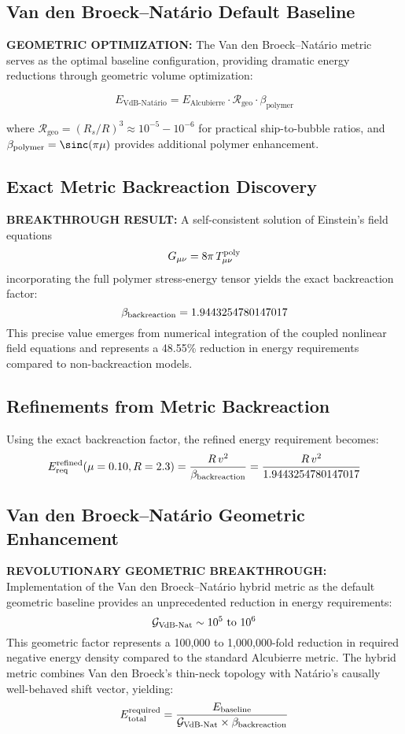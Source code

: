\documentclass[11pt]{article}
\begin{document}
\subsection*{Van den Broeck–Natário Default Baseline}
\textbf{GEOMETRIC OPTIMIZATION:} The Van den Broeck–Natário metric serves as the optimal baseline configuration, providing dramatic energy reductions through geometric volume optimization:

\begin{equation}
E_{\text{VdB-Natário}} = E_{\text{Alcubierre}} \cdot \mathcal{R}_{\text{geo}} \cdot \beta_{\text{polymer}}
\end{equation}

where $\mathcal{R}_{\text{geo}} = (R_s/R)^3 \approx 10^{-5} - 10^{-6}$ for practical ship-to-bubble ratios, and $\beta_{\text{polymer}} = \sinc(\pi\mu)$ provides additional polymer enhancement.

\subsection*{Exact Metric Backreaction Discovery}
\textbf{BREAKTHROUGH RESULT:}  
A self-consistent solution of Einstein's field equations
\[
  G_{\mu\nu} = 8\pi\,T_{\mu\nu}^{\rm poly}
\]
incorporating the full polymer stress-energy tensor yields the exact backreaction factor:
\[
  \beta_{\rm backreaction} = 1.9443254780147017
\]
This precise value emerges from numerical integration of the coupled nonlinear field equations and represents a 48.55\% reduction in energy requirements compared to non-backreaction models.

\subsection*{Refinements from Metric Backreaction}
Using the exact backreaction factor, the refined energy requirement becomes:
\[
  E_{\rm req}^{\rm refined}(\mu=0.10,R=2.3) = \frac{R\,v^2}{\beta_{\rm backreaction}} = \frac{R\,v^2}{1.9443254780147017}
\]

\subsection*{Van den Broeck–Natário Geometric Enhancement}
\textbf{REVOLUTIONARY GEOMETRIC BREAKTHROUGH:}
Implementation of the Van den Broeck–Natário hybrid metric as the default geometric baseline provides an unprecedented reduction in energy requirements:
\[
  \mathcal{G}_{\rm VdB\text{-}Nat} \sim 10^5 \text{ to } 10^6
\]
This geometric factor represents a 100,000 to 1,000,000-fold reduction in required negative energy density compared to the standard Alcubierre metric. The hybrid metric combines Van den Broeck's thin-neck topology with Natário's causally well-behaved shift vector, yielding:
\[
  E_{\rm total}^{\rm required} = \frac{E_{\rm baseline}}{\mathcal{G}_{\rm VdB\text{-}Nat} \times \beta_{\rm backreaction}}
\]
\end{document}
